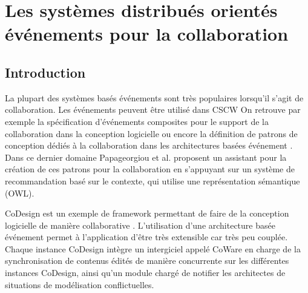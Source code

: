 
\section{Les systèmes distribués orientés événements pour la collaboration}

	\subsection{Introduction}
La plupart des systèmes basés événements sont très populaires lorsqu'il s'agit de 
collaboration\cite{Helmer2011}. Les événements peuvent être utilisé dans 
\gls{CSCW}
On retrouve par exemple la spécification 
d'événements composites 
pour le support de la collaboration dans la conception logicielle \cite{Yuan2002} 
ou encore la définition de patrons de conception dédiés à la collaboration dans les 
architectures basées événement \cite{Verginadis2009}. Dans ce dernier domaine 
Papageorgiou et al. \cite{Papageorgiou2011} proposent un assistant pour la 
création de ces patrons pour la collaboration en s'appuyant sur un système de 
recommandation basé sur le contexte, qui utilise une représentation sémantique 
(\gls{OWL}).

CoDesign est un exemple de \gls{framework} permettant de faire de la 
conception logicielle de manière collaborative \cite{Bang2010}. L'utilisation d'une 
architecture basée événement permet à l'application d'être très extensible car très 
peu couplée. Chaque instance CoDesign intègre un intergiciel appelé CoWare en 
charge de la synchronisation de contenus édités de manière concurrente sur les 
différentes instances CoDesign, ainsi qu'un module chargé de notifier les 
architectes de situations de modélisation conflictuelles. 

